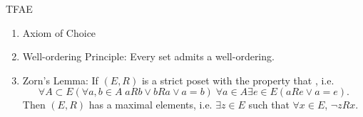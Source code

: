 \documentclass[notoc,notitlepage]{tufte-book}
\begin{document}
\begin{thm}\label{thm:axiom_of_choice_and_its_equivalents}
  TFAE
  \begin{enumerate}
    \item Axiom of Choice
    \item Well-ordering Principle: Every set admits a well-ordering.\label{item:well_ordering_principle}
    \item Zorn's Lemma: If $(E, R)$ is a strict poset with the property that , i.e.
      \begin{equation*}
        \forall A \subset E ( \forall a, b \in A \; aRb \lor bRa \lor a = b ) \; \forall a \in A \exists e \in E ( aRe \lor a = e ).
      \end{equation*}
      Then $(E, R)$ has a maximal elements, i.e. $\exists z \in E$ such that $\forall x \in E$, $\neg z R x$.\label{item:zorn_s_lemma}
  \end{enumerate}
\end{thm}
\end{document}

